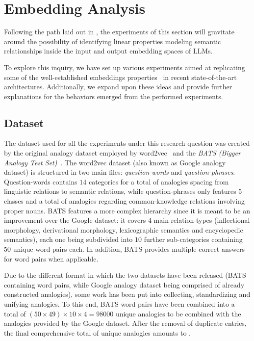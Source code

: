 \section{Embedding Analysis}

Following the path laid out in , the experiments of this section will gravitate around the possibility of identifying linear properties modeling semantic relationships inside the input and output embedding spaces of LLMs.

To explore this inquiry, we have set up various experiments aimed at replicating some of the well-established embeddings properties~\cite{mikolov2013} in recent state-of-the-art architectures.
Additionally, we expand upon these ideas and provide further explanations for the behaviors emerged from the performed experiments.

\subsection{Dataset}

The dataset used for all the experiments under this research question was created by  the original analogy dataset employed by word2vec~\cite{mikolov2013} and the \textit{BATS (Bigger Analogy Test Set)}~\cite{drozd2016}.
The word2vec dataset (also known as Google analogy dataset) is structured in two main files: \textit{question-words} and \textit{question-phrases}.
Question-words contains $14$ categories for a total of  analogies spacing from linguistic relations to semantic relations, while question-phrases only features $5$ classes and a total of  analogies regarding common-knowledge relations involving proper nouns.
BATS features a more complex hierarchy since it is meant to be an improvement over the Google dataset: it covers $4$ main relation types (inflectional morphology, derivational morphology, lexicographic semantics and encyclopedic semantics), each one being subdivided into $10$ further sub-categories containing $50$ unique word pairs each.
In addition, BATS provides multiple correct answers for word pairs when applicable. 

Due to the different format in which the two datasets have been released (BATS containing word pairs, while Google analogy dataset being comprised of already constructed analogies), some work has been put into collecting, standardizing and unifying analogies.
To this end, BATS word pairs have been combined into a total of $(50 \times 49) \times 10 \times 4 = 98000$ unique analogies to be combined with the  analogies provided by the Google dataset.
After the removal of duplicate entries, the final comprehensive total of unique analogies amounts to .

